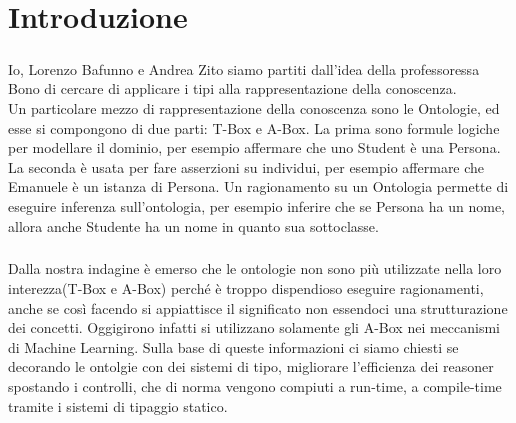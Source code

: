 \chapter{Introduzione}

\paragraph{} Io, Lorenzo Bafunno e Andrea Zito siamo partiti dall'idea della professoressa Bono di cercare di applicare i tipi alla rappresentazione della conoscenza. \\
Un particolare mezzo di rappresentazione della conoscenza sono le Ontologie, ed esse si compongono di due parti: T-Box e A-Box. La prima sono formule logiche per modellare il dominio, per esempio affermare che uno Student è una Persona. La seconda è usata per fare asserzioni su individui, per esempio affermare che Emanuele è un istanza di Persona. Un ragionamento su un Ontologia permette di eseguire inferenza sull'ontologia, per esempio inferire che se Persona ha un nome, allora anche Studente ha un nome in quanto sua sottoclasse. 

\paragraph{} Dalla nostra indagine è emerso che le ontologie non sono più utilizzate nella loro interezza(T-Box e A-Box) perché è troppo dispendioso eseguire ragionamenti, anche se così facendo si appiattisce il significato non essendoci una strutturazione dei concetti. Oggigirono infatti si utilizzano solamente gli A-Box nei meccanismi di Machine Learning. Sulla base di queste informazioni ci siamo chiesti se decorando le ontolgie con dei sistemi di tipo, migliorare l'efficienza dei reasoner spostando i controlli, che di norma vengono compiuti a run-time, a compile-time tramite i sistemi di tipaggio statico.     


